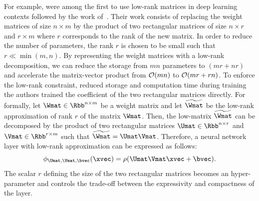 \noindent
For example, \citet{sainath2013lowrank} were among the first to use low-rank matrices in deep learning contexts followed by the work of~\citet{jaderberg2014speeding,yu2017compressing}.
Their work consists of replacing the weight matrices of size $n \times m$ by the product of two rectangular matrices of size $n \times r$ and $r \times m$ where $r$ corresponds to the rank of the new matrix. 
In order to reduce the number of parameters, the rank $r$ is chosen to be small such that $r \ll \min(m, n)$.
By representing the weight matrices with a low-rank decomposition, we can reduce the storage from $mn$ parameters to $(mr + nr)$ and accelerate the matrix-vector product from $\mathcal{O}(mn)$ to $\mathcal{O}(mr + rn)$.
To enforce the low-rank constraint, reduced storage and computation time during training the authors trained the coefficient of the two rectangular matrices directly. 
For formally, let $\Wmat \in \Rbb^{n \times m}$ be a weight matrix and let $\widetilde{\Wmat}$ be the low-rank approximation of rank $r$ of the matrix $\Wmat$.
Then, the low-matrix $\widetilde{\Wmat}$ can be decomposed by the product of two rectangular matrices $\Umat \in \Rbb^{n \times r}$ and $\Vmat \in \Rbb^{r \times m}$ such that $\widetilde{\Wmat} = \Umat \Vmat$.
Therefore, a neural network layer with low-rank approximation can be expressed as follows:
\begin{equation}
  \layer_{\Umat, \Vmat, \bvec} (\xvec) = \act\left( \Umat \Vmat \xvec + \bvec \right) .
\end{equation}
The scalar $r$ defining the size of the two rectangular matrices becomes an hyper-parameter and controls the trade-off between the expressivity and compactness of the layer. 

